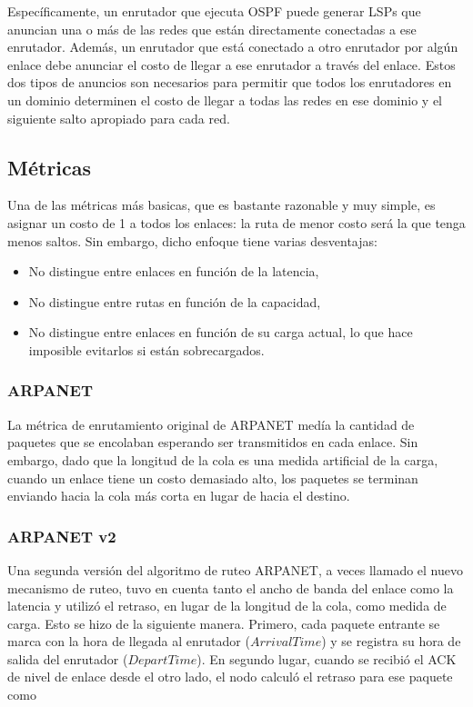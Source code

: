 Específicamente, un enrutador que ejecuta OSPF puede generar LSPs que anuncian una o más de las redes que están directamente conectadas a ese enrutador. Además, un enrutador que está conectado a otro enrutador por algún enlace debe anunciar el costo de llegar a ese enrutador a través del enlace. Estos dos tipos de anuncios son necesarios para permitir que todos los enrutadores en un dominio determinen el costo de llegar a todas las redes en ese dominio y el siguiente salto apropiado para cada red.

\subsection{Métricas}
Una de las métricas más basicas, que es bastante razonable y muy simple, es asignar un costo de 1 a todos los enlaces: la ruta de menor costo será la que tenga menos saltos. Sin embargo, dicho enfoque tiene varias desventajas:
\begin{itemize}
  \item No distingue entre enlaces en función de la latencia,
  \item No distingue entre rutas en función de la capacidad,
  \item No distingue entre enlaces en función de su carga actual, lo que hace imposible evitarlos si están sobrecargados.
\end{itemize}

\subsubsection{ARPANET}
La métrica de enrutamiento original de ARPANET medía la cantidad de paquetes que se encolaban esperando ser transmitidos en cada enlace. Sin embargo, dado que la longitud de la cola es una medida artificial de la carga, cuando un enlace tiene un costo demasiado alto, los paquetes se terminan enviando hacia la cola más corta en lugar de hacia el destino.

\subsubsection{ARPANET v2}
Una segunda versión del algoritmo de ruteo ARPANET, a veces llamado el nuevo mecanismo de ruteo, tuvo en cuenta tanto el ancho de banda del enlace como la latencia y utilizó el retraso, en lugar de la longitud de la cola, como medida de carga. Esto se hizo de la siguiente manera. Primero, cada paquete entrante se marca con la hora de llegada al enrutador (\(ArrivalTime\)) y se registra su hora de salida del enrutador (\(DepartTime\)). En segundo lugar, cuando se recibió el ACK de nivel de enlace desde el otro lado, el nodo calculó el retraso para ese paquete como 

